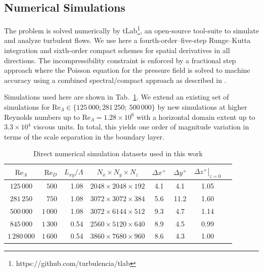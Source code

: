 \documentclass[a4paper,11pt]{amsart}
\newcommand{\RE}{\mathrm{Re}}
\begin{document}
\subsection{Numerical Simulations}
The problem is solved numerically by tLab\footnote{https://github.com/turbulencia/tlab},
an open-source tool-suite to simulate and analyze turbulent flows.
% 
We use here a fourth-order--five-step Runge--Kutta integration and sixth-order compact schemes
for spatial derivatives in all directions.
%
The incompressibility constraint is enforced by a fractional step approach where the Poisson equation
for the pressure field is solved to machine accuracy using a combined spectral/compact approach as
described in \citet{mellado:ZaM2012}.
%
\par
%
Simulations used here are shown in Tab.~\ref{tab:sim-setup}.
%
We extend an existing set of simulations for $\RE_\Lambda\in\{125\,000; 281\,250;\ 500\,000\}$ \citep[gray shading; cf.][]{ansorge:BM2014,ansorge:JFM2016} 
by new simulations at higher Reynolds numbers up to $\RE_\Lambda=1.28\times10^6$ with a horizontal domain extent up to $3.3\times 10^4$ viscous units. 
%
In total, this yields one order of magnitude variation in terms of the scale separation in the boundary layer.
%
\begin{table}
  \caption{Direct numerical simulation datasets used in this
    work \label{tab:sim-setup}}
  \begin{tabular}{c r r c c c c c}
    \toprule 
    $\RE_\Lambda$ & $\RE_D$ & $L_{xy}/\Lambda$ & $N_x\times N_y\times N_z$ & $\Delta x^+$ & $\Delta y^+$ & $\left.\Delta z^+\right|_{z=0}$ \\ 
    \midrule
    \rowcolor{gray!30}
       $125\,000$ &    $500$& 1.08 & $2048\times2048\times192$&4.1& 4.1& 1.05\\
    \rowcolor{gray!30}
       $281\,250$ & $   750$& 1.08 & $3072\times3072\times384$&5.6&11.2& 1.60\\
    \rowcolor{gray!30}
       $500\,000$ & $1\,000$& 1.08 & $3072\times6144\times512$&9.3& 4.7& 1.14\\
    \midrule
       $845\,000$ & $1\,300$& 0.54 & $2560\times5120\times640$&8.9& 4.5& 0.99\\

    $1\,280\,000$ & $1\,600$& 0.54 & $3860\times7680\times960$&8.6& 4.3& 1.00\\ 
    \bottomrule 
  \end{tabular} 
\end{table}
%
\end{document}
